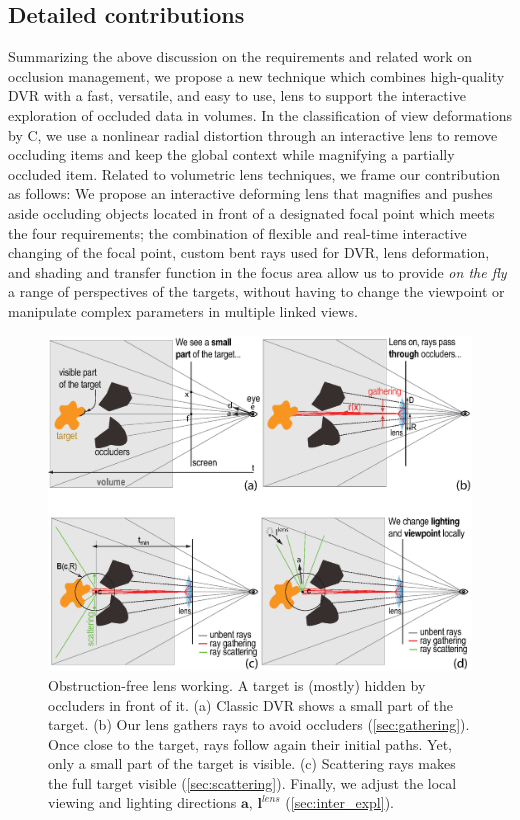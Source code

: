 \subsection{Detailed contributions}
%
Summarizing the above discussion on the requirements and related work on occlusion management, we propose a new technique which combines high-quality DVR with a fast, versatile, and easy to use, lens to support the interactive exploration of occluded data in volumes. In the classification of view deformations by C\cite{595268}, we use a nonlinear radial distortion through an interactive lens to remove occluding items and keep the global context while magnifying a partially occluded item. Related to volumetric lens techniques, we frame our contribution as follows: We propose an interactive deforming lens that magnifies and pushes aside occluding objects located in front of a designated focal point which meets the four requirements; the combination of flexible and real-time interactive changing of the focal point, custom bent rays used for DVR, lens deformation, and shading and transfer function in the focus area allow us to provide \emph{on the fly} a range of perspectives of the targets, without having to change the viewpoint or manipulate complex parameters in multiple linked views.


\begin{figure}
\centering

\includegraphics [width=\textwidth]{images/principle.eps}

\caption{Obstruction-free lens working. A target is (mostly) hidden by occluders in front of it. (a) Classic DVR shows a small part of the target. (b) Our lens gathers rays to avoid occluders (\autoref{sec:gathering}). Once close to the target, rays follow again their initial paths. Yet, only a small part of the target is visible. (c) Scattering rays makes the full target visible (\autoref{sec:scattering}). Finally, we adjust the local viewing and lighting directions $\mathbf{a}$, $\mathbf{l}^{lens}$ (\autoref{sec:inter_expl}).}
\label{f:fisheye}

\end{figure}
